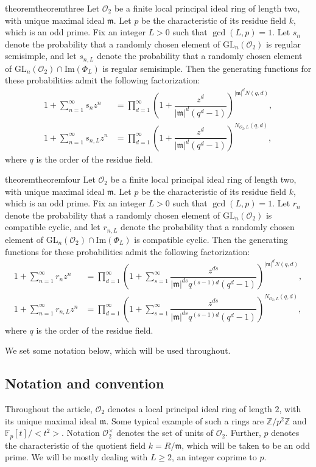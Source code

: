 \documentclass[11pt,twoside]{amsart}
\newcommand{\GL}{\mathrm{GL}}
\newcommand{\im}{\mathrm{Im}}
\newcommand{\R}{\mathscr{O}_2}
\theoremstyle{definition} %
\begin{document}
\begin{restatable}{theorem}{theoremthree}\label{thm:gen-fun}
Let $\R$ be a finite local principal ideal ring of length two, with unique maximal ideal $\mathfrak{m}$. Let $p$ be the characteristic of its residue field $k$, which is an odd prime. Fix an integer $L > 0$ such that $\gcd(L, p) = 1$. Let $s_n$ denote the probability that a randomly chosen element of $\GL_n(\R)$ is regular semisimple, and let $s_{n, L}$ denote the probability that a randomly chosen element of $\GL_n(\R) \cap \im(\Phi_L)$ is regular semisimple. Then the generating functions for these probabilities admit the following factorization:
\begin{align}
1+\sum\limits_{n=1}^{\infty} s_nz^n& = \prod_{d=1}^{\infty}\left(1+\dfrac{z^d}{|\mathfrak{m}|^d(q^d-1)}\right)^{|\mathfrak m|^d N(q,d)},\\
1+\sum\limits_{n=1}^{\infty} s_{n,L}z^n& = \prod_{d=1}^{\infty}\left(1+\dfrac{z^d}{|\mathfrak{m}|^d(q^d-1)}\right)^{N_{\R,L}(q,d)},
\end{align}
where $q$ is the order of the residue field.
\end{restatable}
\begin{restatable}{theorem}{theoremfour}\label{thm:gen-fun-cyc}
Let $\R$ be a finite local principal ideal ring of length two, with unique maximal ideal $\mathfrak{m}$. Let $p$ be the characteristic of its residue field $k$, which is an odd prime. Fix an integer $L > 0$ such that $\gcd(L, p) = 1$. Let $r_n$ denote the probability that a randomly chosen element of $\GL_n(\R)$ is compatible cyclic, and let $r_{n, L}$ denote the probability that a randomly chosen element of $\GL_n(\R) \cap \im(\Phi_L)$ is compatible cyclic. Then the generating functions for these probabilities admit the following factorization:
\begin{align}
1+\sum\limits_{n=1}^{\infty} r_nz^n& = \prod_{d=1}^{\infty}\left(1+\sum\limits_{s=1}^{\infty}\dfrac{z^{ds}}{|\mathfrak{m}|^{ds}q^{(s-1)d}(q^d-1)}\right)^{|\mathfrak m|^d N(q,d)},\\
1+\sum\limits_{n=1}^{\infty} r_{n,L}z^n& = \prod_{d=1}^{\infty}\left(1+\sum\limits_{s=1}^{\infty}\dfrac{z^{ds}}{|\mathfrak{m}|^{ds}q^{(s-1)d}(q^d-1)}\right)^{N_{\R,L}(q,d)},
\end{align}
where $q$ is the order of the residue field.
\end{restatable}
\noindent We set some notation below, which will be used throughout. 

\subsection*{Notation and convention}
Throughout the article, $\R$ denotes a local principal ideal ring of length $2$, with its unique maximal ideal $\mathfrak{m}$. Some typical example of such a rings are $\mathbb{Z}/p^2\mathbb{Z}$ and $\mathbb F_p[t]/<t^2>$. Notation $\R^\times$ denotes the set of units of $\R$. Further, $p$ denotes the characteristic of the quotient field $k = R/\mathfrak m$, which will be taken to be an odd prime. We will be mostly dealing with $L\geq 2$, an integer coprime to $p$. 
\end{document}
